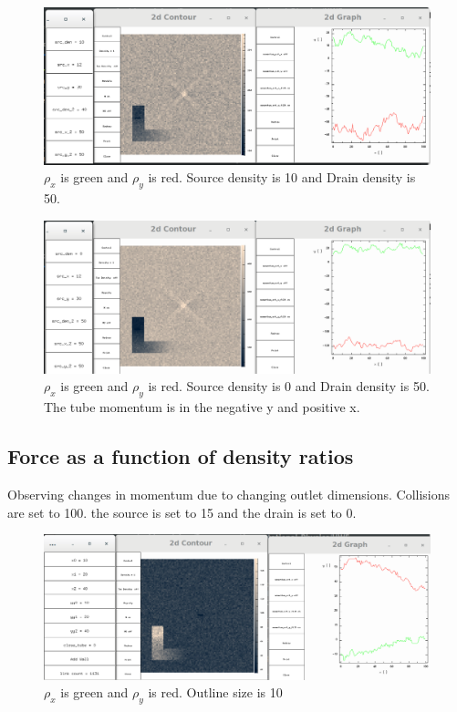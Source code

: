 \documentclass{article}
\begin{document}
\begin{figure}[H]
\centering
\includegraphics[scale=0.25]{source_10_drain_40.png}
\caption{\label{fig} $\rho_x$ is green and $\rho_y$ is red. Source density is 10 and Drain density is 50.}
\end{figure}

\begin{figure}[H]
\centering
\includegraphics[scale=0.25]{source_0_drain_50.png}
\caption{\label{fig} $\rho_x$ is green and $\rho_y$ is red. Source density is 0 and Drain density is 50. The tube momentum is in the negative y and positive x.}
\end{figure}

\vspace{5mm}
\subsection{Force as a function of density ratios}
Observing changes in momentum due to changing outlet dimensions. Collisions are set to 100. the source is set to 15 and the drain is set to 0.
\vspace{5mm}

\begin{figure}[H]
\centering
\includegraphics[scale=0.25]{df_10.png}
\caption{\label{fig} $\rho_x$ is green and $\rho_y$ is red. Outline size is 10}
\end{figure}
\end{document}
